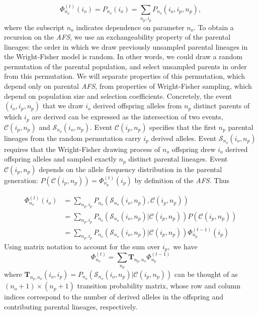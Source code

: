 \documentclass[review]{elsarticle}
\newcommand{\afs}[2]{\Phi_{#1}^{(#2)}}
\begin{document}
\begin{equation}
  \afs{n_o}{t}(i_o)=P_{n_o} (i_o) =\sum_{n_p,i_p} P_{n_o}(i_o,i_p,n_p),
\end{equation}
where the subscript $n_o$ indicates dependence on parameter $n_o$. To obtain a recursion on the
\textit{AFS}, we use an exchangeability property of the parental lineages: the order
 in which we draw previously unsampled parental lineages in the Wright-Fisher
model is random. 
In other words, we could draw a random permutation of the parental population, and select unsampled parents
in order from this permutation. We will separate properties of this permutation, which depend only
on parental \textit{AFS}, from properties of Wright-Fisher sampling, which depend on population
size and selection coefficients.  Concretely, the event $(i_o, i_p,n_p)$ that we draw $i_o$ derived offspring 
alleles from $n_p$ distinct parents of which $i_p$ are derived can be expressed as the intersection of two events,
$\mathcal{C}(i_p,n_p)$ and $\mathcal{S}_{n_o}(i_o, n_p)$. Event $\mathcal{C}(i_p,n_p)$ specifies that the
first $n_p$ parental lineages from the random permutation carry $i_p$ derived alleles. Event
$\mathcal{S}_{n_o}(i_o, n_p)$ requires that the Wright-Fisher drawing process of $n_o$ offspring drew $i_o$ derived offspring alleles 
and sampled exactly $n_p$ distinct parental lineages. Event $\mathcal{C}(i_p, n_p)$ depends on the allele
frequency distribution in the parental generation: $P(\mathcal{C}(i_p,n_p)) =\afs{n_p}{t} (i_p)$
by definition of the \textit{AFS}. Thus 

\begin{equation}
  \begin{split}
    \afs{n_o}{t}(i_o)&= \sum_{n_p,i_p} P_{n_o}(\mathcal{S}_{n_o}(i_o, n_p), \mathcal{C}(i_p,n_p) )\\
    &=   \sum_{n_p,i_p} P_{n_o}(\mathcal{S}_{n_o}(i_o, n_p)| \mathcal{C}(i_p,n_p) ) P(\mathcal{C}(i_p,n_p))\\
    &=   \sum_{n_p,i_p} P_{n_o}(\mathcal{S}_{n_o}(i_o, n_p)| \mathcal{C}(i_p,n_p) )  \afs{n_p}{t-1}(i_p)%
  \end{split}
\end{equation}
Using matrix notation to account for the sum over $i_p,$ we have 
\begin{equation}
  \afs{n_o}{t} = \sum_{n_p}  \mathbf{T}_{n_p,n_o}     \afs{n_p}{t-1}
    \label{eq_recur}
  \end{equation}
where $\mathbf{T}_{n_p,n_o}(i_o,i_p) = P_{n_o}(\mathcal{S}_{n_o}(i_o, n_p)| \mathcal{C}(i_p,n_p) ) $ can be thought of as $(n_o+1) \times (n_p+1)$ transition
probability matrix, whose row and column indices correspond to the number of derived alleles in the
offspring and contributing parental lineages, respectively.
\end{document}
